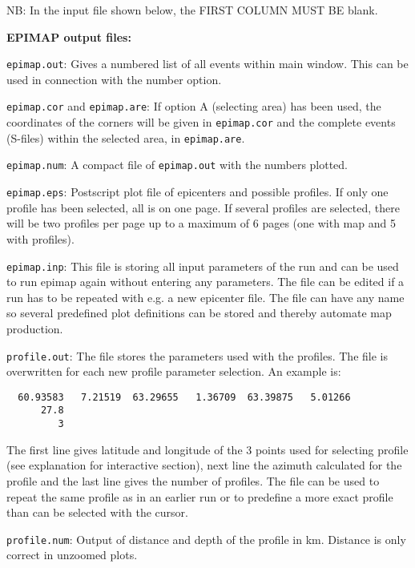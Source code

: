NB: In the input file shown below, the FIRST COLUMN MUST BE blank. 



\textbf{EPIMAP output files:}

\texttt{epimap.out}: Gives a numbered list of all events within main window. This can be used in connection with the number option. 

\texttt{epimap.cor} and \texttt{epimap.are}: If option A (selecting area) has been used, the coordinates of the corners will be given in \texttt{epimap.cor} and the complete events (S-files) within the selected area, in \texttt{epimap.are}.  

\texttt{epimap.num}: A compact file of \texttt{epimap.out} with the numbers plotted. 

\texttt{epimap.eps}: Postscript plot file of epicenters and possible profiles. If only one profile has been selected, all is on one page. If several profiles are selected, there will be two profiles per page up to a maximum of 6 pages (one with map and 5 with profiles). 

\texttt{epimap.inp}: This file is storing all input parameters of the run and can be used to run epimap again without entering any parameters. The file can be edited if a run has to be repeated with e.g. a new epicenter file. The file can have any name so several predefined plot definitions can be stored and thereby automate map production. 

\texttt{profile.out}: The file stores the parameters used with the profiles. The file is overwritten for each new profile parameter selection. An example is: 

\begin{verbatim}
  60.93583   7.21519  63.29655   1.36709  63.39875   5.01266
      27.8
         3
\end{verbatim}

The first line gives latitude and longitude of the 3 points used for selecting profile (see explanation for interactive section), next line the azimuth calculated for the profile and the last line gives the number of profiles. The file can be used to repeat the same profile as in an earlier run or to predefine a more exact profile than can be selected with the cursor. 

\texttt{profile.num}: Output of distance and depth of the profile in km. Distance is only correct in unzoomed plots. 

